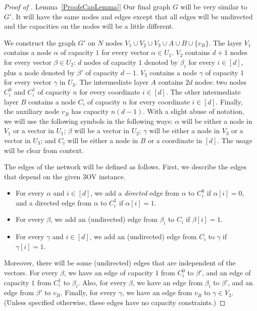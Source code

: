 \documentclass[11pt]{article}
\numberwithin{equation}{section}
\theoremstyle{definition}
\theoremstyle{plain}
\newcommand{\expref}[2]{\hyperref[#2]{#1~\ref{#2}}}
\theoremstyle{plain}
\newcommand{\ProblemName}[1]{\textsf{#1}}
\newcommand{\TOV}{\ProblemName{$3$OV}\xspace}
\begin{document}
\begin{proof}[Proof of \expref{Lemma}{ProofsCapLemma}]
Our final graph $G$ will be very similar to $G'$. It will have the same nodes and edges except that all edges will be undirected and the capacities on the nodes will be a little different.

We construct the graph $G'$ on $N$ nodes $V_1\cup V_2\cup V_3\cup A\cup B\cup \{v_B\}$.
The layer $V_1$ contains a node $\alpha$ of capacity $1$ for every vector $\alpha\in U_1$.
$V_2$ contains $d+1$ nodes for every vector $\beta\in U_2$: $d$ nodes of capacity $1$ denoted by $\beta_i$ for every $i\in[d]$, plus a node denoted by $\beta'$ of capacity $d-1$.
$V_3$ contains a node $\gamma$ of capacity $1$ for every vector $\gamma$ in $U_3$.
The intermediate layer $A$ contains $2d$ nodes: two nodes $C_i^{0}$ and $C_i^{1}$ of capacity $n$ for every coordinate $i\in [d]$.
The other intermediate layer $B$ contains a node $C_i$ of capacity $n$ for every coordinate $i\in [d]$.
Finally, the auxiliary node $v_B$ has capacity $n(d-1)$.
With a slight abuse of notation, we will use the following symbols in the following ways: $\alpha$ will be either a node in $V_1$ or a vector in $U_1$; $\beta$ will be a vector in $U_2$;  $\gamma$ will be either a node in $V_3$ or a vector in $U_3$; and $C_i$ will be either a node in $B$ or a coordinate in $[d]$. The usage will be clear from context.

The edges of the network will be defined as follows. First, we describe the edges that depend on the given \TOV instance.
\begin{itemize}
\item For every $\alpha$ and $i\in [d]$, we add a \emph{directed} edge from $\alpha$ to $C_i^{0}$ if $\alpha [i]=0$, and a directed edge from $\alpha$ to $C_i^{1}$ if $\alpha [i]=1$.
\item For every $\beta$, we add an (undirected) edge from $\beta_i$ to $C_i$ if $\beta [i]=1$.
\item  For every $\gamma$ and $i\in [d]$, we add an (undirected) edge from $C_i$ to $\gamma$ if $\gamma [i]=1$.
\end{itemize}
Moreover, there will be some (undirected) edges that are independent of the vectors.
For every $\beta$, we have an edge of capacity $1$ from $C_i^{0}$ to ${\beta}'$, and an edge of capacity $1$ from $C_i^{1}$ to $\beta_i$.
Also, for every $\beta$, we have an edge from $\beta_i$ to $\beta'$, and an edge from ${\beta}'$ to $v_B$.
Finally, for every $\gamma$, we have an edge from $v_B$ to $\gamma\in V_3$. (Unless specified otherwise, these edges have no capacity constraints.)


\end{proof}
\end{document}
